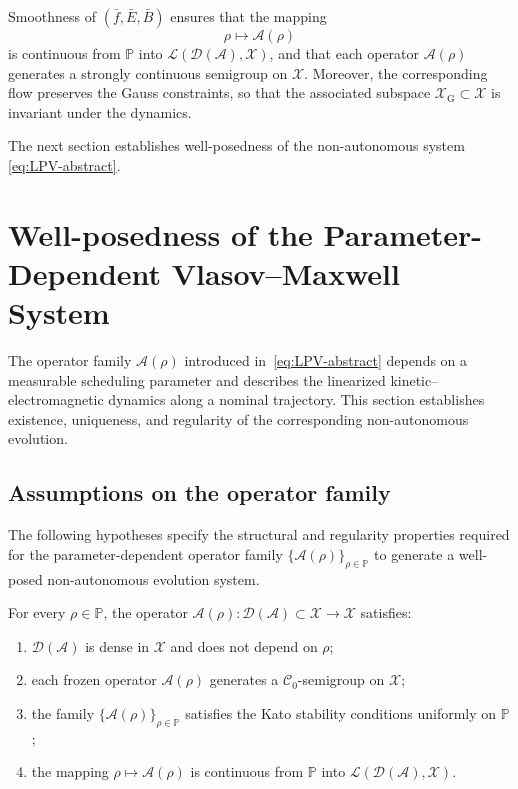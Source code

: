 \documentclass[AMA,Times2COL]{WileyNJDv5}
\begin{document}
\smallskip
Smoothness of $(\bar f,\bar E,\bar B)$ ensures that the mapping
\[
\rho\mapsto \mathcal{A}(\rho)
\]
is continuous from $\mathbb{P}$ into
$\mathcal{L}(\mathcal{D}(\mathcal{A}),\mathscr{X})$, and that each operator $\mathcal{A}(\rho)$ generates a strongly continuous semigroup on $\mathscr{X}$.
Moreover, the corresponding flow preserves the Gauss constraints, so that the associated subspace $\mathscr{X}_{\mathrm G}\subset\mathscr{X}$ is invariant
under the dynamics.

\smallskip
The next section establishes well-posedness of the non-autonomous system
\eqref{eq:LPV-abstract}.


\section{Well-posedness of the Parameter-Dependent Vlasov--Maxwell System}
\label{sec:wellposed}

The operator family $\mathcal{A}(\rho)$ introduced in~\eqref{eq:LPV-abstract} depends on a measurable scheduling parameter and describes the linearized
kinetic--electromagnetic dynamics along a nominal trajectory.  
This section establishes existence, uniqueness, and regularity of the corresponding non-autonomous evolution.

\subsection{Assumptions on the operator family}

The following hypotheses specify the structural and regularity properties required for the parameter-dependent operator family $\{\mathcal{A}(\rho)\}_{\rho\in\mathbb{P}}$ to generate a well-posed non-autonomous evolution system.

\begin{assumption}\label{ass:A}
For every $\rho\in\mathbb{P}$, the operator $\mathcal{A}(\rho):\mathcal{D}(\mathcal{A})\subset\mathscr{X}\to\mathscr{X}$
satisfies:
\begin{enumerate}
    \item[\rm(i)] $\mathcal{D}(\mathcal{A})$ is dense in $\mathscr{X}$ and does not depend on $\rho$;
    \item[\rm(ii)] each frozen operator $\mathcal{A}(\rho)$ generates a $\mathcal{C}_0$-semigroup on $\mathscr{X}$;
    \item[\rm(iii)] the family $\{\mathcal{A}(\rho)\}_{\rho\in\mathbb P}$ satisfies the Kato stability conditions uniformly on $\mathbb P$;
    \item[\rm(iv)] the mapping
    $\rho\mapsto\mathcal{A}(\rho)$ is continuous from $\mathbb P$ into
    $\mathcal{L}(\mathcal{D}(\mathcal{A}),\mathscr{X})$.
\end{enumerate}
\end{assumption}
\end{document}
